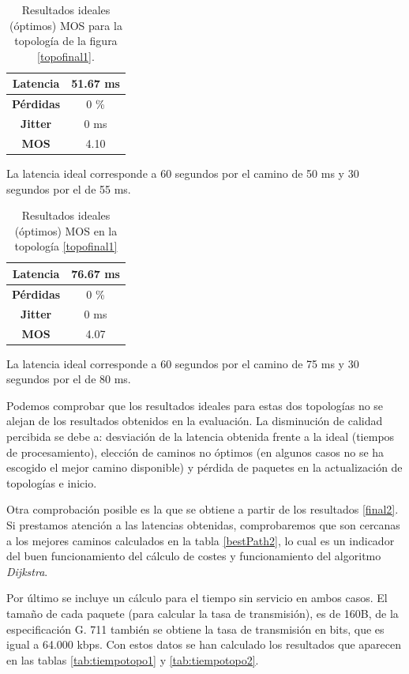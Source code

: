 \documentclass[a4paper,11pt]{book}
\begin{document}
\begin{table}[tb]
\centering
\begin{tabular}{|c|c|}
\hline
{\bf Latencia} & 51.67 ms  \\ \hline
{\bf Pérdidas} & 0 \%       \\ \hline
{\bf Jitter}   & 0 ms     \\ \hline
{\bf MOS}      & 4.10     \\ \hline
\end{tabular}
\caption{Resultados ideales (óptimos) \ac{MOS} para la topología de la figura \ref{topofinal1}.}
\label{ideal1}
\end{table}

La latencia ideal corresponde a 60 segundos por el camino de 50 ms y 30 segundos por el de 55 ms.

\begin{table}[tb]
\centering
\begin{tabular}{|c|c|}
\hline
{\bf Latencia} & 76.67 ms  \\ \hline
{\bf Pérdidas} & 0 \%        \\ \hline
{\bf Jitter}   & 0 ms     \\ \hline
{\bf MOS}      & 4.07     \\ \hline
\end{tabular}
\caption{Resultados ideales (óptimos) \ac{MOS} en la topología \ref{topofinal1}}
\label{ideal2}
\end{table}

La latencia ideal corresponde a 60 segundos por el camino de 75 ms y 30 segundos por el de 80 ms.

Podemos comprobar que los resultados ideales para estas dos topologías no se alejan de los resultados obtenidos en la evaluación. La disminución de calidad percibida se debe a: desviación de la latencia obtenida frente a la ideal (tiempos de procesamiento), elección de caminos no óptimos (en algunos casos no se ha escogido el mejor camino disponible) y pérdida de paquetes en la actualización de topologías e inicio.

Otra comprobación posible es la que se obtiene a partir de los resultados \ref{final2}. Si prestamos atención a las latencias obtenidas, comprobaremos que son cercanas a los mejores caminos calculados en la tabla \ref{bestPath2}, lo cual es un indicador del buen funcionamiento del cálculo de costes y funcionamiento del algoritmo \textit{Dijkstra}.

Por último se incluye un cálculo para el tiempo sin servicio en ambos casos. El tamaño de cada paquete (para calcular la tasa de transmisión), es de 160B, de la especificación G. 711 \cite{ituG711} también se obtiene la tasa de transmisión en bits, que es igual a 64.000 kbps. Con estos datos se han calculado los resultados que aparecen en las tablas \ref{tab:tiempotopo1} y \ref{tab:tiempotopo2}.
\end{document}
